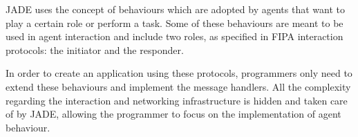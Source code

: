 JADE uses the concept of behaviours which are adopted by agents that want to play a certain role or perform a task.
Some of these behaviours are meant to be used in agent interaction and include two roles, as specified in FIPA interaction protocols: the initiator and the responder.

In order to create an application using these protocols, programmers only need to extend these behaviours and implement the message handlers.
All the complexity regarding the interaction and networking infrastructure is hidden and taken care of by JADE, allowing the programmer to focus on the implementation of agent behaviour.